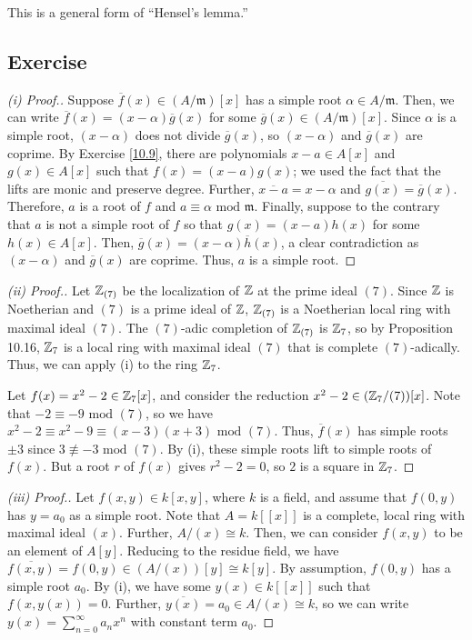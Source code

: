 \begin{remark}
This is a general form of ``Hensel's lemma.''
\end{remark}

\subsection{Exercise}\label{10.10}

\begin{proof}[(i) Proof.]
Suppose $\overline{f}(x) \in (A/\mathfrak{m})[x]$ has a simple root $\alpha \in A/\mathfrak{m}$. Then, we can write
$\overline{f}(x) = (x - \alpha)\overline{g}(x)$ for some $\overline{g}(x) \in (A/\mathfrak{m})[x]$. Since
$\alpha$ is a simple root, $(x - \alpha)$ does not divide $\overline{g}(x)$, so $(x - \alpha)$ and $\overline{g}(x)$ are
coprime. By Exercise \ref{10.9}, there are polynomials $x - a \in A[x]$ and $g(x) \in A[x]$ such that $f(x) = (x - a)g(x)$;
we used the fact that the lifts are monic and preserve degree. Further, $\overline{x - a} = x - \alpha$ and $\overline{g(x)} = \overline{g}(x)$.
Therefore, $a$ is a root of $f$ and $a \equiv \alpha \text{ mod } \mathfrak{m}$. Finally, suppose to the contrary that
$a$ is not a simple root of $f$ so that $g(x) = (x - a)h(x)$ for some $h(x) \in A[x]$. Then, 
$\overline{g}(x) = (x-\alpha)\overline{h}(x)$, a clear contradiction as $(x - \alpha)$ and $\overline{g}(x)$ are coprime.
Thus, $a$ is a simple root.
\end{proof}

\begin{proof}[(ii) Proof.]
Let $\mathbb{Z}_{(7)}$ be the localization of $\mathbb{Z}$ at the prime ideal $(7)$. Since $\mathbb{Z}$ is Noetherian and $(7)$ is a prime ideal of $\mathbb{Z}$,
$\mathbb{Z}_{(7)}$ is a Noetherian local ring with maximal ideal $(7)$. The $(7)$-adic completion of $\mathbb{Z}_{(7)}$ is $\mathbb{Z}_7$, so by Proposition 10.16,
$\mathbb{Z}_7$ is a local ring with maximal ideal $(7)$ that is complete $(7)$-adically. Thus, we can apply (i) to the ring $\mathbb{Z}_7$.

Let $f(x) = x^2 - 2 \in \mathbb{Z}_7[x]$, and consider the reduction $x^2 - 2 \in (\mathbb{Z}_7/(7))[x]$. Note that $-2 \equiv -9 \text{ mod } (7)$, so we have 
$x^2 - 2 \equiv x^2 - 9 \equiv (x - 3)(x + 3) \text{ mod } (7)$. Thus, $\overline{f}(x)$ has simple roots $\pm 3$ since $3 \not\equiv -3 \text{ mod }(7)$. 
By (i), these simple roots lift to simple roots of $f(x)$. But a root $r$ of $f(x)$ gives $r^2 - 2 = 0$, so $2$ is a square in $\mathbb{Z}_7$.
\end{proof}

\begin{proof}[(iii) Proof.]
Let $f(x,y) \in k[x,y]$, where $k$ is a field, and assume that $f(0, y)$ has $y = a_0$ as a simple root. Note that $A = k[[x]]$ is a complete,
local ring with maximal ideal $(x)$. Further, $A/(x) \cong k$. Then, we can consider $f(x,y)$ to be an element of $A[y]$. Reducing to the residue
field, we have $\overline{f(x,y)} = f(0,y) \in (A/(x))[y] \cong k[y]$. By assumption, $f(0,y)$ has a simple root $a_0$. By (i), we have some 
$y(x) \in k[[x]]$ such that $f(x,y(x)) = 0$. Further, $\overline{y(x)} = a_0 \in A/(x) \cong k$, so we can write $y(x) = \sum_{n=0}^{\infty}a_n x^n$
with constant term $a_0$.
\end{proof}

